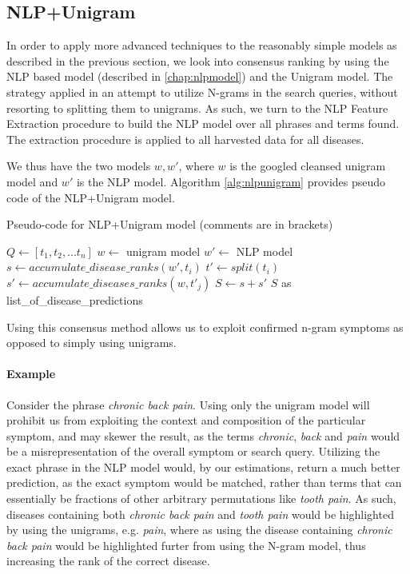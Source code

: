 \documentclass[10pt,letterpaper,final]{article}
\begin{document}
\subsection{NLP+Unigram}
In order to apply more advanced techniques to the reasonably simple
models as described in the previous section, we look into consensus
ranking by using the NLP based model (described in \ref{chap:nlpmodel}) and the Unigram model.
The strategy applied in an attempt to utilize N-grams in the search
queries, without resorting to splitting them to unigrams. As such, we
turn to the NLP Feature Extraction procedure to build the NLP model over
all phrases and terms found. The extraction procedure is applied to
all harvested data for all diseases.

We thus have the two models $w, w'$, where $w$ is the googled cleansed
unigram model and $w'$ is the NLP model. Algorithm \ref{alg:nlpunigram}
provides pseudo code of the NLP+Unigram model.

\begin{algorithm}
\caption{Pseudo-code for NLP+Unigram model (comments are in brackets)}
\begin{algorithmic}

\STATE $Q \gets [t_{1}, t_{2}, ... t_{n}]$ 
\STATE $w \gets$ unigram model
\STATE $w' \gets$ NLP model
        \STATE $s \gets accumulate\_disease\_ranks(w', t_{i})$ 
    \ENDIF
    \STATE $t' \gets split(t_{i})$ %
        \STATE $s' \gets accumulate\_diseases\_ranks(w, t'_{j})$
    \ENDFOR
    \STATE $S \gets s + s'$
\ENDFOR
\RETURN $S$ as list\_of\_disease\_predictions

\end{algorithmic}
\label{alg:nlpunigram}
\end{algorithm}

Using this consensus method allows us to exploit confirmed n-gram
symptoms as opposed to simply using unigrams.

\paragraph{Example} Consider the phrase \textit{chronic back pain}.
Using only the unigram model will prohibit us from exploiting the
context and composition of the particular symptom, and may skewer the
result, as the terms \textit{chronic}, \textit{back} and \textit{pain}
would be a misrepresentation of the overall symptom or search query.
Utilizing the exact phrase in the NLP model would, by our estimations,
return a much better prediction, as the exact symptom would be matched,
rather than terms that can essentially be fractions of other arbitrary
permutations like \textit{tooth pain}. As such, diseases containing both
\textit{chronic back pain} and \textit{tooth pain} would be highlighted
by using the unigrams, e.g. \textit{pain}, where as using the disease
containing \textit{chronic back pain} would be highlighted furter from
using the N-gram model, thus increasing the rank of the correct disease.
\newline
\end{document}
